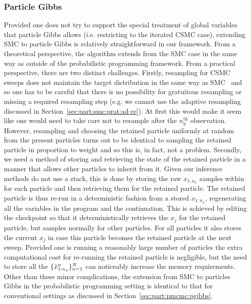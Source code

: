 \subsubsection{Particle Gibbs}
\label{sec:proginf:str:part:pgibbs}

Provided one does not try to support the special treatment of global variables that particle
Gibbs allows (i.e. restricting to the iterated CSMC case), extending SMC to particle Gibbs
is relatively straightforward in our framework.  From a theoretical perspective, the algorithm
extends from the SMC case in the same way as outside of the probabilistic programming framework.
From a practical perspective, there are two distinct challenges. Firstly, resampling for CSMC
sweeps does not maintain the target distribution in the same way as SMC~\citep{holenstein2009particle} and so one has
to be careful that there is no possibility for gratuitous resampling or missing a required resampling step (e.g. 
we cannot use the adaptive resampling discussed in Section~\ref{sec:part:smc:prat:ad-re}).
At first this would make it
seem like one would need to take care not to resample after the $n_y^{\mathrm{th}}$ observation.
However, resampling and choosing the retained particle uniformly at random from the
present particles turns out to be identical to sampling the retained particle in proportion to weight and
so this is, in fact, not a problem.  Secondly, we need a method of storing and retrieving the
state of the retained particle in a manner that allows other particles to inherit from it.  Given our
inference methods do not use a stack, this is done by storing the raw $x_{1:n_x}$ samples within
\angstate for each particle and then retrieving them for the retained particle.  The retained
particle is thus re-run in a deterministic fashion from a stored $x_{1:n_x}$, regenerating
all the variables in the program and the continuation.  This is achieved by
editing the \sample checkpoint so that it deterministically retrieves the $x_j$ for the 
retained particle, but samples normally for other particles.  For all particles it also stores the current
$x_j$ in case this particle becomes the retained particle at the next sweep.
Provided one is running a reasonably large number of particles the extra computational cost for
re-running the retained particle is negligible, but the need to store all the $\{\hat{x}_{1:n_x}^n\}_{n=1}^{N}$
can noticeably increase the memory requirements.  Other than these minor complications, the
extension from SMC to particles Gibbs in the probabilistic programming setting is identical to
that for conventional settings as discussed in Section~\ref{sec:part:pmcmc:pgibbs}.

